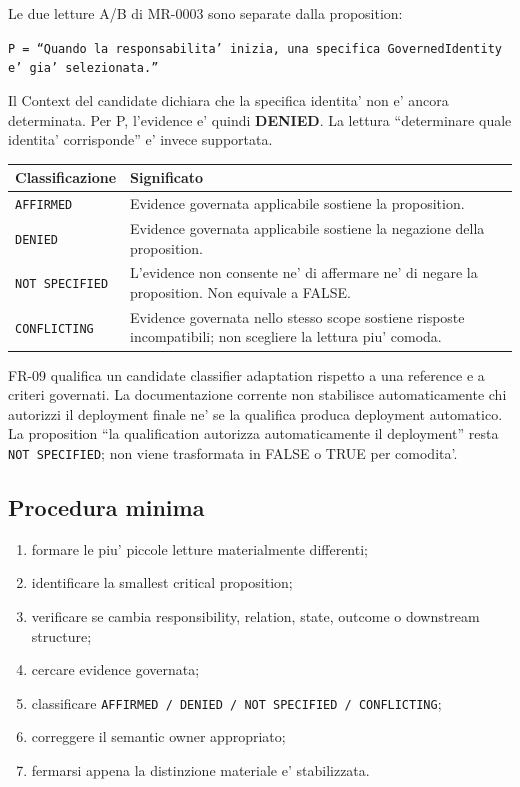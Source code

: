 \documentclass[11pt,a4paper]{article}
\begin{document}
\begin{ddtaexample}[title={Facial Access - smallest critical proposition}]
Le due letture A/B di MR-0003 sono separate dalla proposition:\par
\texttt{P = ``Quando la responsabilita' inizia, una specifica GovernedIdentity e' gia' selezionata.''}\par
Il Context del candidate dichiara che la specifica identita' non e' ancora determinata. Per P, l'evidence e' quindi \textbf{DENIED}. La lettura ``determinare quale identita' corrisponde'' e' invece supportata.
\end{ddtaexample}

\begin{tabularx}{\textwidth}{L{38mm}Y}
\toprule
\textbf{Classificazione} & \textbf{Significato} \\
\midrule
\texttt{AFFIRMED} & Evidence governata applicabile sostiene la proposition. \\
\texttt{DENIED} & Evidence governata applicabile sostiene la negazione della proposition. \\
\texttt{NOT SPECIFIED} & L'evidence non consente ne' di affermare ne' di negare la proposition. Non equivale a FALSE. \\
\texttt{CONFLICTING} & Evidence governata nello stesso scope sostiene risposte incompatibili; non scegliere la lettura piu' comoda. \\
\bottomrule
\end{tabularx}

\begin{ddtaexample}[title={DermaTriage - NOT SPECIFIED senza inventare authority}]
FR-09 qualifica un candidate classifier adaptation rispetto a una reference e a criteri governati. La documentazione corrente non stabilisce automaticamente chi autorizzi il deployment finale ne' se la qualifica produca deployment automatico. La proposition ``la qualification autorizza automaticamente il deployment'' resta \texttt{NOT SPECIFIED}; non viene trasformata in FALSE o TRUE per comodita'.
\end{ddtaexample}

\subsection{Procedura minima}
\begin{enumerate}
  \item formare le piu' piccole letture materialmente differenti;
  \item identificare la smallest critical proposition;
  \item verificare se cambia responsibility, relation, state, outcome o downstream structure;
  \item cercare evidence governata;
  \item classificare \texttt{AFFIRMED / DENIED / NOT SPECIFIED / CONFLICTING};
  \item correggere il semantic owner appropriato;
  \item fermarsi appena la distinzione materiale e' stabilizzata.
\end{enumerate}
\end{document}
